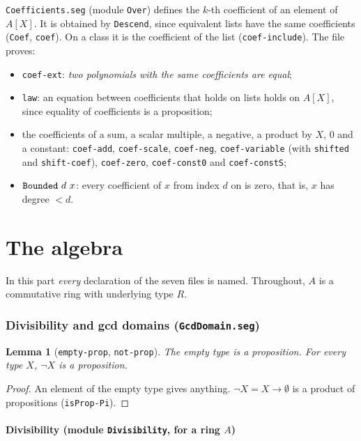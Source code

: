 \documentclass[11pt]{amsart}
\newtheorem{lemma}[theorem]{Lemma}
\theoremstyle{definition}
\theoremstyle{remark}
\newcommand{\nm}[1]{\textup{\texttt{#1}}}
\newcommand{\file}[1]{\textup{\texttt{#1.seg}}}
\begin{document}
\file{Coefficients} (module \nm{Over}) defines the $k$-th coefficient of
an element of $A[X]$. It is obtained by \nm{Descend}, since equivalent
lists have the same coefficients (\nm{Coef}, \nm{coef}). On a class it is
the coefficient of the list (\nm{coef-include}). The file proves:
\begin{itemize}
\item \nm{coef-ext}: \emph{two polynomials with the same coefficients are
  equal};
\item \nm{law}: an equation between coefficients that holds on lists holds
  on $A[X]$, since equality of coefficients is a proposition;
\item the coefficients of a sum, a scalar multiple, a negative, a product
  by $X$, $0$ and a constant: \nm{coef-add}, \nm{coef-scale},
  \nm{coef-neg}, \nm{coef-variable} (with \nm{shifted} and
  \nm{shift-coef}), \nm{coef-zero}, \nm{coef-const0} and
  \nm{coef-constS};
\item $\nm{Bounded}\ d\ x$: every coefficient of $x$ from index $d$ on is
  zero, that is, $x$ has degree $<d$.
\end{itemize}

\part{The algebra}\label{part:algebra}

In this part \emph{every} declaration of the seven files is named.
Throughout, $A$ is a commutative ring with underlying type $R$.

\section{Divisibility and gcd domains (\file{GcdDomain})}

\begin{lemma}[\nm{empty-prop}, \nm{not-prop}]
The empty type is a proposition. For every type $X$, $\neg X$ is a
proposition.
\end{lemma}
\begin{proof}
An element of the empty type gives anything. $\neg X = X\to\emptyset$ is a
product of propositions (\nm{isProp-Pi}).
\end{proof}

\subsection{Divisibility (module \nm{Divisibility}, for a ring $A$)}
\end{document}
